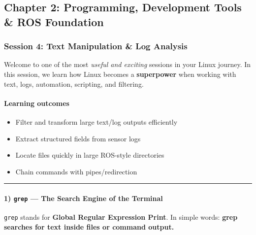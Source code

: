 \documentclass[
  english,
  paper=a4,
  oneside  ,captions=tableheading
]{scrartcl}
\providecommand{\tightlist}{%
  \setlength{\itemsep}{0pt}\setlength{\parskip}{0pt}}
\renewenvironment{quote}{\begin{customblockquote}\list{}{\rightmargin=0em\leftmargin=0em}%
\item\relax\color{blockquote-text}\ignorespaces}{\unskip\unskip\endlist\end{customblockquote}}
\begin{document}
\subsection{Chapter 2: Programming, Development Tools \& ROS
Foundation}\label{chapter-2-programming-development-tools-ros-foundation}

\subsubsection{Session 4: Text Manipulation \& Log
Analysis}\label{session-4-text-manipulation-log-analysis}

\begin{quote}
Welcome to one of the most \emph{useful and exciting} sessions in your
Linux journey. In this session, we learn how Linux becomes a
\textbf{superpower} when working with text, logs, automation, scripting,
and filtering.
\end{quote}

\paragraph{Learning outcomes}\label{learning-outcomes-3}

\begin{itemize}
\tightlist
\item
  Filter and transform large text/log outputs efficiently
\item
  Extract structured fields from sensor logs
\item
  Locate files quickly in large ROS-style directories
\item
  Chain commands with pipes/redirection
\end{itemize}

\begin{center}\rule{0.5\linewidth}{0.5pt}\end{center}

\paragraph{\texorpdfstring{1) \texttt{grep} --- The Search Engine of the
Terminal}{1) grep --- The Search Engine of the Terminal}}\label{grep-the-search-engine-of-the-terminal}

\texttt{grep} stands for \textbf{Global Regular Expression Print}. In
simple words: \textbf{grep searches for text inside files or command
output.}
\end{document}
